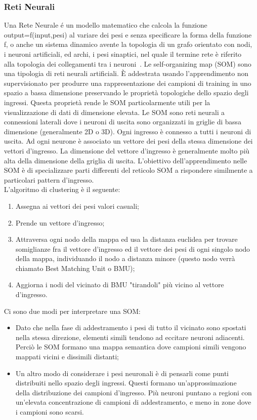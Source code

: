 \subsubsection{Reti Neurali}
Una Rete Neurale é un modello matematico che calcola la funzione output=f(input,pesi) al variare dei pesi e senza specificare la forma della funzione f, o anche un sistema dinamico avente la topologia di un grafo orientato con nodi, i neuroni artificiali, ed archi, i pesi sinaptici, nel quale il termine rete è riferito alla topologia dei collegamenti tra i neuroni~\cite{10}. Le self-organizing map (SOM) sono una tipologia di reti neurali artificiali. È addestrata usando l'apprendimento non supervisionato per produrre una rappresentazione dei campioni di training in uno spazio a bassa dimensione preservando le proprietà topologiche dello spazio degli ingressi. Questa proprietà rende le SOM particolarmente utili per la visualizzazione di dati di dimensione elevata. Le SOM sono reti neurali a connessioni laterali dove i neuroni di uscita sono organizzati in griglie di bassa dimensione (generalmente 2D o 3D). Ogni ingresso è connesso a tutti i neuroni di uscita. Ad ogni neurone è associato un vettore dei pesi della stessa dimensione dei vettori d'ingresso. La dimensione del vettore d'ingresso è generalmente molto più alta della dimensione della griglia di uscita. L'obiettivo dell'apprendimento nelle SOM è di specializzare parti differenti del reticolo SOM a rispondere similmente a particolari pattern d'ingresso.\\
L'algoritmo di clustering è il seguente:
\begin{enumerate}
	\item Assegna ai vettori dei pesi valori casuali;
	\item Prende un vettore d'ingresso;
	\item Attraversa ogni nodo della mappa ed usa la distanza euclidea per trovare somiglianze fra il vettore d'ingresso ed il vettore dei pesi di ogni singolo nodo della mappa, individuando il nodo a distanza minore (questo nodo verrà chiamato Best Matching Unit o BMU);
	\item Aggiorna i nodi del vicinato di BMU "tirandoli" più vicino al vettore d'ingresso.
\end{enumerate}
Ci sono due modi per interpretare una SOM:
\begin{itemize}
	\item Dato che nella fase di addestramento i pesi di tutto il vicinato sono spostati nella stessa direzione, elementi simili tendono ad eccitare neuroni adiacenti. Perciò le SOM formano una mappa semantica dove campioni simili vengono mappati vicini e dissimili distanti;
	\item Un altro modo di considerare i pesi neuronali è di pensarli come punti distribuiti nello spazio degli ingressi. Questi formano un'approssimazione della distribuzione dei campioni d'ingresso. Più neuroni puntano a regioni con un'elevata concentrazione di campioni di addestramento, e meno in zone dove i campioni sono scarsi.
\end{itemize}
